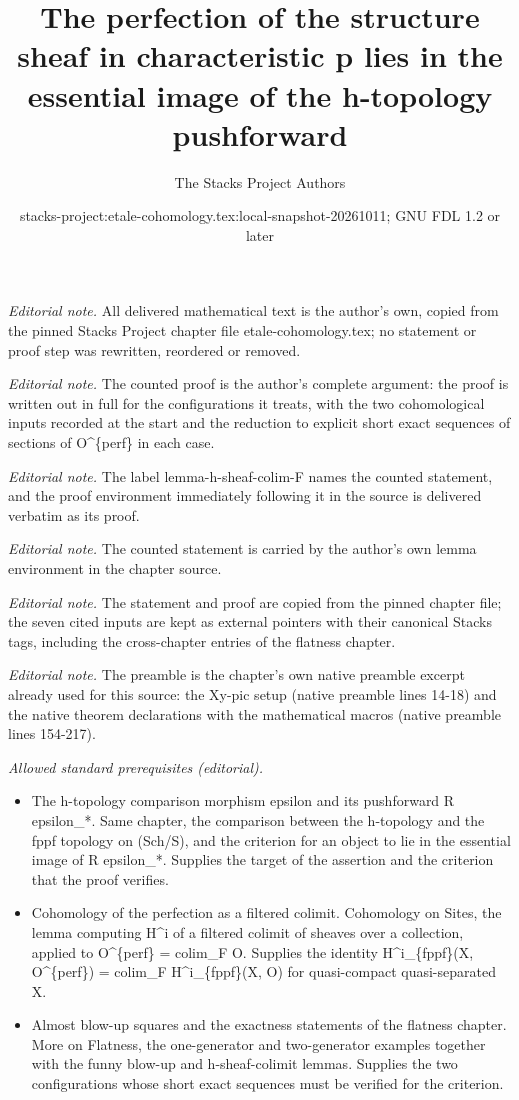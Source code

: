\documentclass[10pt,a4paper]{amsart}
\title{The perfection of the structure sheaf in characteristic p lies in the essential image of the h-topology pushforward}
\author{The Stacks Project Authors}
\date{stacks-project:etale-cohomology.tex:local-snapshot-20261011; GNU FDL 1.2 or later}
\theoremstyle{plain}
\theoremstyle{definition}
\theoremstyle{remark}
\numberwithin{equation}{subsection}
\begin{document}
\maketitle
\noindent\textit{Editorial note.} All delivered mathematical text is the author's own, copied from the pinned Stacks Project chapter file etale-cohomology.tex; no statement or proof step was rewritten, reordered or removed.\par\medskip
\noindent\textit{Editorial note.} The counted proof is the author's complete argument: the proof is written out in full for the configurations it treats, with the two cohomological inputs recorded at the start and the reduction to explicit short exact sequences of sections of O\textasciicircum{}\{perf\} in each case.\par\medskip
\noindent\textit{Editorial note.} The label lemma-h-sheaf-colim-F names the counted statement, and the proof environment immediately following it in the source is delivered verbatim as its proof.\par\medskip
\noindent\textit{Editorial note.} The counted statement is carried by the author's own lemma environment in the chapter source.\par\medskip
\noindent\textit{Editorial note.} The statement and proof are copied from the pinned chapter file; the seven cited inputs are kept as external pointers with their canonical Stacks tags, including the cross-chapter entries of the flatness chapter.\par\medskip
\noindent\textit{Editorial note.} The preamble is the chapter's own native preamble excerpt already used for this source: the Xy-pic setup (native preamble lines 14-18) and the native theorem declarations with the mathematical macros (native preamble lines 154-217).\par\medskip
\noindent\textit{Allowed standard prerequisites (editorial).}\begin{itemize}
\item The h-topology comparison morphism epsilon and its pushforward R epsilon\_*. Same chapter, the comparison between the h-topology and the fppf topology on (Sch/S), and the criterion for an object to lie in the essential image of R epsilon\_*. Supplies the target of the assertion and the criterion that the proof verifies.
\item Cohomology of the perfection as a filtered colimit. Cohomology on Sites, the lemma computing H\textasciicircum{}i of a filtered colimit of sheaves over a collection, applied to O\textasciicircum{}\{perf\} = colim\_F O. Supplies the identity H\textasciicircum{}i\_\{fppf\}(X, O\textasciicircum{}\{perf\}) = colim\_F H\textasciicircum{}i\_\{fppf\}(X, O) for quasi-compact quasi-separated X.
\item Almost blow-up squares and the exactness statements of the flatness chapter. More on Flatness, the one-generator and two-generator examples together with the funny blow-up and h-sheaf-colimit lemmas. Supplies the two configurations whose short exact sequences must be verified for the criterion.
\end{itemize}\medskip
\end{document}

